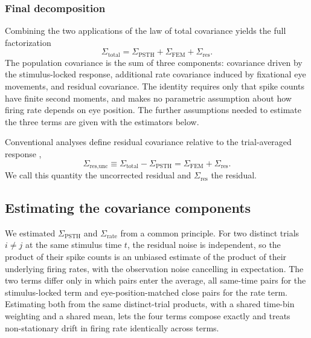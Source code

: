 \documentclass{lite}
\newcommand{\Cpsth}{\Sigma_{\text{PSTH}}}
\newcommand{\Crate}{\Sigma_{\text{rate}}}
\begin{document}
\subsubsection{Final decomposition}

Combining the two applications of the law of total covariance yields the full factorization
\begin{equation}
\Sigma_{\text{total}} = \Sigma_{\text{PSTH}} + \Sigma_{\text{FEM}} + \Sigma_{\text{res}}.
\end{equation}
The population covariance is the sum of three components: covariance driven by the stimulus-locked response, additional rate covariance induced by fixational eye movements, and residual covariance. The identity requires only that spike counts have finite second moments, and makes no parametric assumption about how firing rate depends on eye position. The further assumptions needed to estimate the three terms are given with the estimators below.

Conventional analyses define residual covariance relative to the trial-averaged response \cite{bair2001correlated,kohn2005stimulus},
\begin{equation}
\Sigma_{\text{res}, \text{unc}} \equiv \Sigma_{\text{total}} - \Sigma_{\text{PSTH}} = \Sigma_{\text{FEM}} + \Sigma_{\text{res}}.
\end{equation}
We call this quantity the uncorrected residual and $\Sigma_{\text{res}}$ the residual.

\subsection{Estimating the covariance components}

We estimated $\Cpsth$ and $\Crate$ from a common principle. For two distinct trials $i \neq j$ at the same stimulus time $t$, the residual noise is independent, so the product of their spike counts is an unbiased estimate of the product of their underlying firing rates, with the observation noise cancelling in expectation. The two terms differ only in which pairs enter the average, all same-time pairs for the stimulus-locked term and eye-position-matched close pairs for the rate term. Estimating both from the same distinct-trial products, with a shared time-bin weighting and a shared mean, lets the four terms compose exactly and treats non-stationary drift in firing rate identically across terms.
\end{document}
